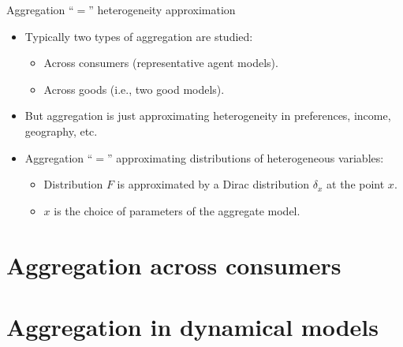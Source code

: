 \documentclass[10pt, handout]{beamer}
\begin{document}
\begin{frame}{Aggregation ``$=$'' heterogeneity approximation}
	\vfill
	\begin{itemize} 
		\item Typically two types of aggregation are studied:
			\begin{itemize}
				\item Across consumers (representative agent models). \vspace{1ex}
				\item Across goods (i.e., two good models). 
			\end{itemize} \vfill \pause

		\item But aggregation is just approximating heterogeneity in preferences, income, geography, etc. \vfill \pause
			
		\item Aggregation ``$=$'' approximating distributions of heterogeneous variables:
			\begin{itemize}
				\item Distribution $F$ is approximated by a Dirac distribution $\delta_{x}$ at the point $x$. \vspace{1ex}
				\item $x$ is the choice of parameters of the aggregate model. 
			\end{itemize} \vfill

	\end{itemize}

\end{frame}

\begin{frame}
	\tableofcontents[currentsection]
\end{frame}

\section{Aggregation across consumers}

\begin{frame}
	\tableofcontents[currentsection]
\end{frame}

\section{Aggregation in dynamical models}
\end{document}
